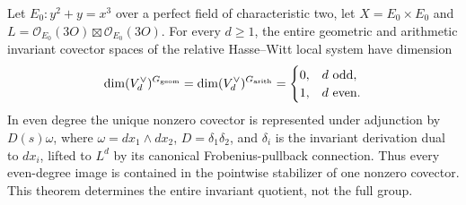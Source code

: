 \begin{theorem}\label{thm:ss-product-exact-covectors}
Let $E_0:y^2+y=x^3$ over a perfect field of characteristic two, let
$X=E_0\times E_0$ and
$L=\mathcal O_{E_0}(3O)\boxtimes\mathcal O_{E_0}(3O)$.
For every $d\ge1$, the entire geometric and arithmetic invariant
covector spaces of the relative Hasse--Witt local system have dimension
\[
 \dim(V_d^\vee)^{G_{\rm geom}}
 =\dim(V_d^\vee)^{G_{\rm arith}}
 =\begin{cases}0,&d\text{ odd},\\1,&d\text{ even}.
 \end{cases}
\]
In even degree the unique nonzero covector is represented under
adjunction by $D(s)\omega$, where
$\omega=dx_1\wedge dx_2$, $D=\delta_1\delta_2$, and $\delta_i$
is the invariant derivation dual to $dx_i$, lifted to $L^d$ by its
canonical Frobenius-pullback connection. Thus every even-degree image
is contained in the pointwise stabilizer of one nonzero covector.
This theorem determines the entire invariant quotient, not the full group.
\end{theorem}

